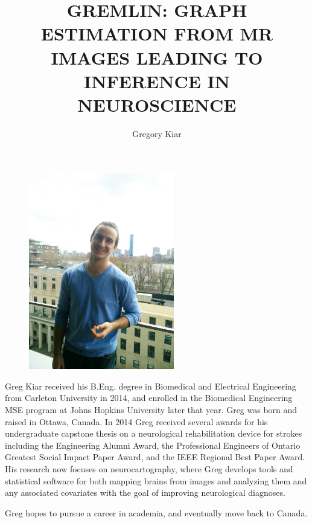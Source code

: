 \documentclass[12pt,oneside,final]{thesis}
\begin{document}
\title{GREMLIN: GRAPH ESTIMATION FROM MR IMAGES LEADING TO INFERENCE IN NEUROSCIENCE}
\author{Gregory Kiar}
\thesis
\masterscienceeng
\copyrightnotice











\begin{vita}
\begin{figure}
\includegraphics[width=2.5in,clip,keepaspectratio]{gkheadshot.jpg}
\end{figure}
Greg Kiar received his B.Eng. degree in Biomedical and Electrical Engineering 
from Carleton University in 2014, and enrolled in the Biomedical Engineering 
MSE program at Johns Hopkins University later that year. Greg was born and raised in Ottawa, Canada. In 2014 Greg received several awards for his undergraduate capstone thesis on a neurological rehabilitation device for strokes including the Engineering Alumni Award, the Professional Engineers of Ontario Greatest Social Impact Paper Award, and the IEEE Regional Best Paper Award. His research now focuses on neurocartography, where Greg develops tools and statistical software for both mapping brains from images and analyzing them and any associated covariates with the goal of improving neurological diagnoses.

Greg hopes to pursue a career in academia, and eventually move back to Canada.
\end{vita}
\end{document}
